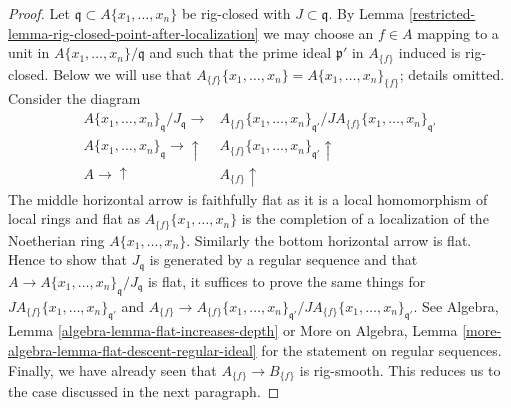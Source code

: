 \begin{proof}
\medskip\noindent
Let $\mathfrak q \subset A\{x_1, \ldots, x_n\}$ be rig-closed with
$J \subset \mathfrak q$. By
Lemma \ref{restricted-lemma-rig-closed-point-after-localization}
we may choose an $f \in A$ mapping to a unit in
$A\{x_1, \ldots, x_n\}/\mathfrak q$ and such
that the prime ideal $\mathfrak p'$ in $A_{\{f\}}$ induced is rig-closed.
Below we will use that
$A_{\{f\}}\{x_1, \ldots, x_n\} = A\{x_1, \ldots, x_n\}_{\{f\}}$;
details omitted. Consider the diagram
$$
\begin{array}{cc}A\{x_1, \ldots, x_n\}_{\mathfrak q} / J_\mathfrak q \longrightarrow & A_{\{f\}}\{x_1, \ldots, x_n\}_{\mathfrak q'}/
J A_{\{f\}}\{x_1, \ldots, x_n\}_{\mathfrak q'} \\ A\{x_1, \ldots, x_n\}_{\mathfrak q} \longrightarrow\uparrow & A_{\{f\}}\{x_1, \ldots, x_n\}_{\mathfrak q'} \uparrow \\ A \longrightarrow\uparrow & A_{\{f\}} \uparrow\end{array}
$$
The middle horizontal arrow is faithfully flat as it is a local
homomorphism of local rings and flat as $A_{\{f\}}\{x_1, \ldots, x_n\}$
is the completion of a localization of the Noetherian ring
$A\{x_1, \ldots, x_n\}$. Similarly the bottom horizontal arrow is flat.
Hence to show that $J_\mathfrak q$ is generated by a regular sequence
and that $A \to A\{x_1, \ldots, x_n\}_{\mathfrak q} / J_\mathfrak q$
is flat, it suffices to prove the same things for
$J A_{\{f\}}\{x_1, \ldots, x_n\}_{\mathfrak q'}$ and
$A_{\{f\}} \to A_{\{f\}}\{x_1, \ldots, x_n\}_{\mathfrak q'}/
J A_{\{f\}}\{x_1, \ldots, x_n\}_{\mathfrak q'}$.
See Algebra, Lemma \ref{algebra-lemma-flat-increases-depth} or
More on Algebra, Lemma \ref{more-algebra-lemma-flat-descent-regular-ideal}
for the statement on regular sequences. Finally, we have already seen that
$A_{\{f\}} \to B_{\{f\}}$ is rig-smooth.
This reduces us to the case discussed in the next paragraph.


\end{proof}
